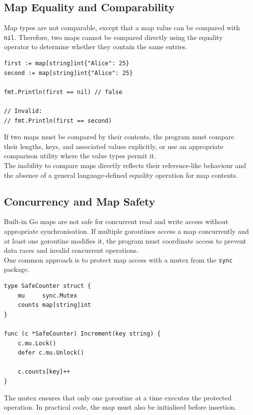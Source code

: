 \subsection{Map Equality and Comparability}

Map types are not comparable, except that a map value
can be compared with \texttt{nil}. Therefore, two maps
cannot be compared directly using the equality operator
to determine whether they contain the same entries.

\begin{lstlisting}
first := map[string]int{"Alice": 25}
second := map[string]int{"Alice": 25}

fmt.Println(first == nil) // false

// Invalid:
// fmt.Println(first == second)
\end{lstlisting}

If two maps must be compared by their contents, the
program must compare their lengths, keys, and associated
values explicitly, or use an appropriate comparison
utility where the value types permit it.\\

The inability to compare maps directly reflects their
reference-like behaviour and the absence of a general
language-defined equality operation for map contents.

\subsection{Concurrency and Map Safety}

Built-in Go maps are not safe for concurrent read and
write access without appropriate synchronisation.
If multiple goroutines access a map concurrently and
at least one goroutine modifies it, the program must
coordinate access to prevent data races and invalid
concurrent operations.\\

One common approach is to protect map access with a
mutex from the \texttt{sync} package.

\begin{lstlisting}
type SafeCounter struct {
    mu     sync.Mutex
    counts map[string]int
}

func (c *SafeCounter) Increment(key string) {
    c.mu.Lock()
    defer c.mu.Unlock()

    c.counts[key]++
}
\end{lstlisting}

The mutex ensures that only one goroutine at a time
executes the protected operation. In practical code,
the map must also be initialised before insertion.\\

